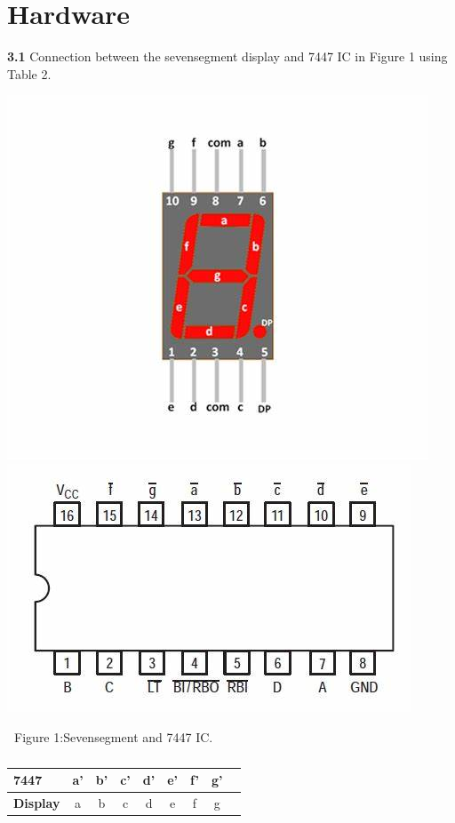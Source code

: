 \documentclass[10pt, a4paper]{article}
\begin{document}
	\section{Hardware}
	\textbf{3.1}
    Connection between the sevensegment display and 7447 IC in Figure 1 using Table 2.
    \begin{center}
\includegraphics[scale=.20]{sevenseg.jpg}
\includegraphics[scale=.20]{7447ic.jpg}
\end{center}
\centering\textbf\ Figure 1:Sevensegment and 7447 IC.
	\begin{table}[htbp]
    \begin{center}
    \begin{tabular}{|l|c|c|c|c|c|c|c|c} \hline \textbf{7447}
  & a' & b' & c' & d' & e' & f' & g' \\
 \hline
\textbf{Display} & a & b & c & d & e & f & g \\ \hline
\end{tabular}   
\end{center}
\caption{\label{table:dummytable} }
\end{table}
\end{document}
